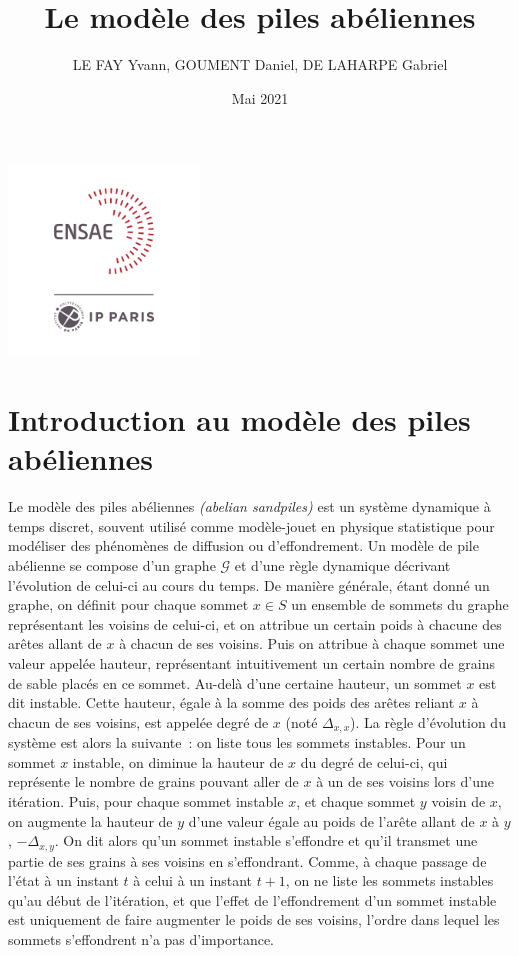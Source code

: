\documentclass{article}
\begin{document}
\title{Le modèle des piles abéliennes}
\author{LE FAY Yvann, GOUMENT Daniel, DE LAHARPE Gabriel}
\date{Mai 2021}
\maketitle
\begin{center}
	\includegraphics[height=2in]{./LOGO-ENSAE.png}
\end{center}
\newpage
\section{Introduction au modèle des piles abéliennes}
 
Le modèle des piles abéliennes \textit{(abelian sandpiles)} est un système dynamique à temps discret, souvent utilisé comme modèle-jouet en physique statistique pour modéliser des phénomènes de diffusion ou d'effondrement. Un modèle de pile abélienne se compose d'un graphe $\mathcal{G}$ et d'une règle dynamique décrivant l'évolution de celui-ci au cours du temps. De manière générale, étant donné un graphe, on définit pour chaque sommet $x\in S$ un ensemble de sommets du graphe représentant les voisins de celui-ci, et on attribue un certain poids à chacune des arêtes allant de $x$ à chacun de ses voisins. Puis on attribue à chaque sommet une valeur appelée hauteur, représentant intuitivement un certain nombre de grains de sable placés en ce sommet. Au-delà d'une certaine hauteur, un sommet $x$ est dit instable. Cette hauteur, égale à la somme des poids des arêtes reliant $x$ à chacun de ses voisins, est appelée degré de $x$ (noté $\Delta_{x,x}$). La règle d’évolution du système est alors la suivante : on liste tous les sommets instables. Pour un sommet $x$ instable, on diminue la hauteur de $x$ du degré de celui-ci, qui représente le nombre de grains pouvant aller de $x$ à un de ses voisins lors d'une itération. Puis, pour chaque sommet instable $x$, et chaque sommet $y$ voisin de $x$, on augmente la hauteur de $y$ d'une valeur égale au poids de l'arête allant de $x$ à $y$, $-\Delta_{x,y}$. On dit alors qu'un sommet instable s'effondre et qu'il transmet une partie de ses grains à ses voisins en s'effondrant. Comme, à chaque passage de l'état à un instant $t$ à celui à un instant $t+1$, on ne liste les sommets instables qu'au début de l'itération, et que l'effet de l'effondrement d'un sommet instable est uniquement de faire augmenter le poids de ses voisins, l'ordre dans lequel les sommets s'effondrent n'a pas d'importance.
\newline
\end{document}

